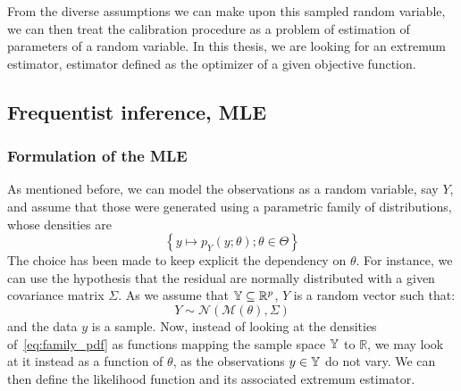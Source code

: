 \documentclass[../../Main_ManuscritThese.tex]{subfiles}
\begin{document}
  From the diverse assumptions we can make upon this sampled random variable, we can then treat the calibration procedure as a problem of estimation of parameters of a random variable.
  In this thesis, we are looking for an extremum estimator, estimator defined as the optimizer of a given objective function.
\subsection{Frequentist inference, MLE}
\label{sec:frequentist_inference_MLE}
\subsubsection{Formulation of the MLE}
As mentioned before, we can model the observations as a random variable, say $Y$, and assume that those were generated using a parametric family of distributions, whose densities are
\begin{equation}
  \label{eq:family_pdf}
  \left\{y\mapsto p_{Y}(y; \theta) ; \theta\in\Theta \right\}
\end{equation}
The choice has been made to keep explicit the dependency on $\theta$. For instance, we can use the hypothesis that the residual are normally distributed with a given covariance matrix $\Sigma$. As we assume that $\mathbb{Y} \subseteq \mathbb{R}^p$, $Y$ is a random vector such that:
\begin{equation}
  \label{eq:lik_gaussian}
  Y  \sim \mathcal{N}(\mathcal{M}(\theta), \Sigma)
\end{equation}
and the data $y$ is a sample.
Now, instead of looking at the densities of~\cref{eq:family_pdf} as functions mapping the sample space $\mathbb{Y}$ to $\mathbb{R}$, we may look at it instead as a function of $\theta$, as the observations $y\in\mathbb{Y}$ do not vary. We can then define the likelihood function and its associated extremum estimator.
\end{document}
